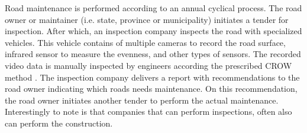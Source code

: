 Road maintenance is performed according to an annual cyclical process. The road owner or maintainer (i.e. state, province or municipality) initiates a tender for inspection. After which, an inspection company inspects the road with specialized vehicles. This vehicle contains of multiple cameras to record the road surface, infrared sensor to measure the evenness, and other types of sensors. The recorded video data is manually inspected by engineers according the prescribed CROW method \cite{CROW_147}. The inspection company delivers a report with recommendations to the road owner indicating which roads needs maintenance. On this recommendation, the road owner initiates another tender to perform the actual maintenance. Interestingly to note is that companies that can perform inspections, often also can perform the construction.

